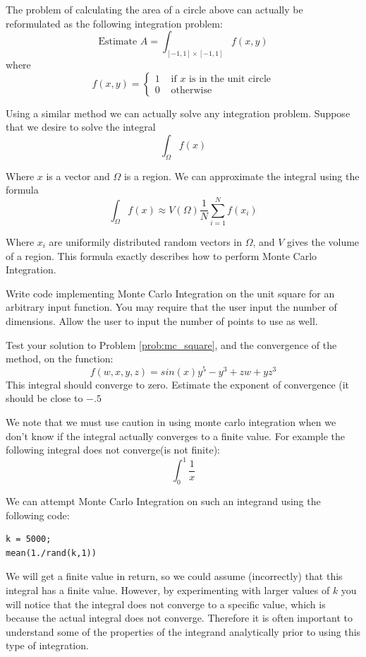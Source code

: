 The problem of calculating the area of a circle above can actually be reformulated as the following integration problem:
\[
\mbox{Estimate }A = \int_{[-1,1]\times[-1,1]} f(x,y)
\]
where
\[
f(x,y) = \begin{cases} 1 &\mbox{ if $x$ is in the unit circle} \\ 0 &\mbox{ otherwise} \end{cases}
\]

Using a similar method we can actually solve any integration problem. Suppose that we desire to solve the integral
\[
\int_\Omega f(x)
\]

Where $x$ is a vector and $\Omega$ is a region. We can approximate the integral using the formula
\[
\int_\Omega f(x) \approx V(\Omega) \frac{1}{N} \sum_{i=1}^N f(x_i)
\]

Where $x_i$ are uniformily distributed random vectors in $\Omega$, and $V$ gives the volume of a region. This formula exactly describes how to perform Monte Carlo Integration.

\begin{problem}
\label{prob:mc_square}
Write code implementing Monte Carlo Integration on the unit square for an arbitrary input function. You may require that the user input the number of dimensions. Allow the user to input the number of points to use as well.
\end{problem}

\begin{problem}
\label{prob:mc_test}
Test your solution to Problem \ref{prob:mc_square}, and the convergence of the method, on the function:
\[
f(w,x,y,z) = sin(x) y^5 -y^3 + zw + yz^3
\]
This integral should converge to zero. Estimate the exponent of convergence (it should be close to $-.5$
\end{problem}

We note that we must use caution in using monte carlo integration when we don't know if the integral actually converges to a finite value. For example the following integral does not converge(is not finite):
\[
\int_0^1 \frac{1}{x}
\]

We can attempt Monte Carlo Integration on such an integrand using the following code:
\begin{matlab}
\begin{lstlisting}[style=matlab]
k = 5000;
mean(1./rand(k,1))
\end{lstlisting}
\end{matlab}

We will get a finite value in return, so we could assume (incorrectly) that this integral has a finite value. However, by experimenting with larger values of $k$ you will notice that the integral does not converge to a specific value, which is because the actual integral does not converge. Therefore it is often important to understand some of the properties of the integrand analytically prior to using this type of integration.

